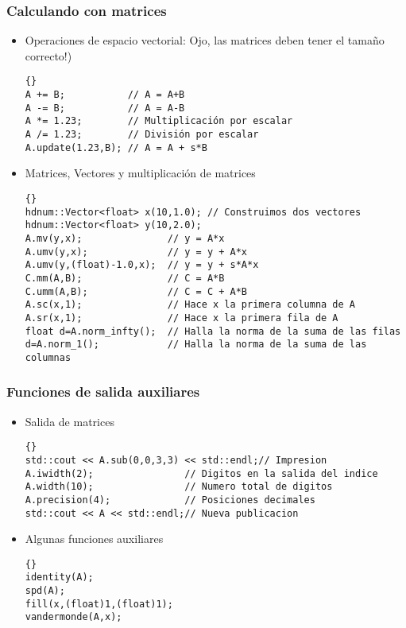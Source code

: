 \documentclass[a4paper,11pt]{article}
\theoremstyle{definition}
\begin{document}
\begin{frame}[fragile]
\frametitle{Calculando con matrices}
\begin{itemize}
\item Operaciones de espacio vectorial: Ojo, las matrices deben
tener el tamaño correcto!)\\
{\footnotesize{\begin{lstlisting}{}
A += B;           // A = A+B
A -= B;           // A = A-B
A *= 1.23;        // Multiplicación por escalar
A /= 1.23;        // División por escalar
A.update(1.23,B); // A = A + s*B
\end{lstlisting}}}
\item Matrices, Vectores y multiplicación de matrices\\
{\footnotesize{\begin{lstlisting}{}
hdnum::Vector<float> x(10,1.0); // Construimos dos vectores
hdnum::Vector<float> y(10,2.0);
A.mv(y,x);               // y = A*x
A.umv(y,x);              // y = y + A*x
A.umv(y,(float)-1.0,x);  // y = y + s*A*x
C.mm(A,B);               // C = A*B
C.umm(A,B);              // C = C + A*B
A.sc(x,1);               // Hace x la primera columna de A
A.sr(x,1);               // Hace x la primera fila de A
float d=A.norm_infty();  // Halla la norma de la suma de las filas
d=A.norm_1();            // Halla la norma de la suma de las columnas
\end{lstlisting}}}
\end{itemize}
\end{frame}

\begin{frame}[fragile]
\frametitle{Funciones de salida auxiliares}
\begin{itemize}
\item Salida de matrices \\
{\footnotesize{\begin{lstlisting}{}
std::cout << A.sub(0,0,3,3) << std::endl;// Impresion
A.iwidth(2);                // Digitos en la salida del indice
A.width(10);                // Numero total de digitos
A.precision(4);             // Posiciones decimales
std::cout << A << std::endl;// Nueva publicacion
\end{lstlisting}}}
\item Algunas funciones auxiliares 
{\footnotesize{\begin{lstlisting}{}
identity(A);
spd(A);
fill(x,(float)1,(float)1);
vandermonde(A,x);
\end{lstlisting}}}
\end{itemize}
\end{frame}
\end{document}
